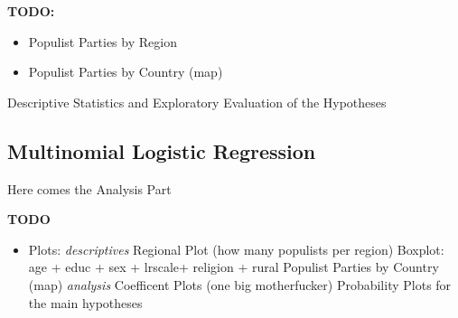 \documentclass[]{article}
\providecommand{\tightlist}{%
  \setlength{\itemsep}{0pt}\setlength{\parskip}{0pt}}
\begin{document}
\textbf{TODO:}

\begin{itemize}
\tightlist
\item
  Populist Parties by Region
\item
  Populist Parties by Country (map)
\end{itemize}

Descriptive Statistics and Exploratory Evaluation of the Hypotheses

\subsection{Multinomial Logistic
Regression}\label{multinomial-logistic-regression}

Here comes the Analysis Part

\textbf{TODO}

\begin{itemize}
\tightlist
\item
  Plots: \emph{descriptives} Regional Plot (how many populists per
  region) Boxplot: age + educ + sex + lrscale+ religion + rural Populist
  Parties by Country (map) \emph{analysis} Coefficent Plots (one big
  motherfucker) Probability Plots for the main hypotheses
\end{itemize}
\end{document}
